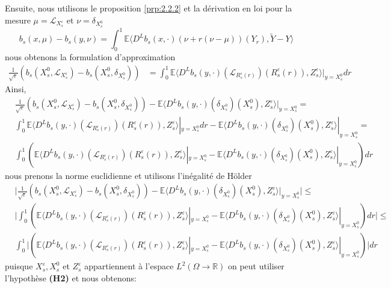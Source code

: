 \documentclass[12pt,a4paper,twoside,fleqn]{book}%
\theoremstyle{definition}
\theoremstyle{lemme}
\numberwithin{equation}{section}
\begin{document}
Ensuite, nous utilisons le proposition \ref{prp:2.2.2} et la dérivation en loi pour la mesure $\mu=\mathcal{L}_{X_s^\varepsilon}$ et $\nu=\delta_{X_s^0}$
\[
b_s(x,\mu)-b_s(y,\nu) = \int_{0}^{1}\mathbb{E}\langle D^Lb_s(x,\cdot)(\nu+r(\nu-\mu))(Y_r),\tilde{Y}-Y\rangle
\]
nous obtenons la formulation d'approximation
\[
\begin{aligned}
	\frac{1}{\sqrt{\varepsilon}}\left(b_s(X_s^0,\mathcal{L}_{X_s^\varepsilon})-b_s(X_s^0,\delta_{X_s^0})\right)&=\int_{0}^{1}\mathbb{E}\langle D^Lb_s(y,\cdot)(\mathcal{L}_{R_s^\varepsilon(r)})(R_s^\varepsilon(r)),Z_s^\varepsilon\rangle|_{y=X_s^0} dr
\end{aligned}
\]
Ainsi,
\[
\begin{aligned}
&\frac{1}{\sqrt{\varepsilon}}\left(b_s(X_s^0,\mathcal{L}_{X_s^\varepsilon})-b_s(X_s^0,\delta_{X_s^0})\right)-\mathbb{E}\langle D^L b_s(y, \cdot)(\delta_{X_s^0})(X_s^0), Z_s^\varepsilon\rangle|_{y=X_s^0} =\\& \int_{0}^{1}\mathbb{E}\langle D^Lb_s(y,\cdot)(\mathcal{L}_{R_s^\varepsilon(r)})(R_s^\varepsilon(r)),Z_s^\varepsilon\rangle|_{y=X_s^0} dr - \mathbb{E}\langle D^L b_s(y, \cdot)(\delta_{X_s^0})(X_s^0), Z_s^\varepsilon\rangle|_{y=X_s^0} =\\
&\int_{0}^{1}\left(\mathbb{E}\langle D^Lb_s(y,\cdot)(\mathcal{L}_{R_s^\varepsilon(r)})(R_s^\varepsilon(r)),Z_s^\varepsilon\rangle|_{y=X_s^0}  - \mathbb{E}\langle D^L b_s(y, \cdot)(\delta_{X_s^0})(X_s^0), Z_s^\varepsilon\rangle|_{y=X_s^0}\right)dr
\end{aligned}
\]
nous prenons la norme euclidienne et utilisons l'inégalité de Hölder
\[
\begin{aligned}&\Big|\frac{1}{\sqrt{\varepsilon}}\left(b_s(X_s^0,\mathcal{L}_{X_s^\varepsilon})-b_s(X_s^0,\delta_{X_s^0})\right)-\mathbb{E}\langle D^L b_s(y, \cdot)(\delta_{X_s^0})(X_s^0), Z_s^\varepsilon\rangle|_{y=X_s^0}\Big|\leq\\
&\Big|\int_{0}^{1}\left(\mathbb{E}\langle D^Lb_s(y,\cdot)(\mathcal{L}_{R_s^\varepsilon(r)})(R_s^\varepsilon(r)),Z_s^\varepsilon\rangle |_{y=X_s^0} - \mathbb{E}\langle D^L b_s(y, \cdot)(\delta_{X_s^0})(X_s^0), Z_s^\varepsilon\rangle|_{y=X_s^0}\right)dr\Big|\leq\\
&\int_{0}^{1}\Big|\left(\mathbb{E}\langle D^Lb_s(y,\cdot)(\mathcal{L}_{R_s^\varepsilon(r)})(R_s^\varepsilon(r)),Z_s^\varepsilon\rangle|_{y=X_s^0}  - \mathbb{E}\langle D^L b_s(y, \cdot)(\delta_{X_s^0})(X_s^0), Z_s^\varepsilon\rangle|_{y=X_s^0}\right)\Big|dr
\end{aligned}
\]
puisque $X_s^\varepsilon,X_s^0$ et $Z_s^\varepsilon$ appartiennent à l’espace $L^2(\Omega\to\mathbb{R})$ on peut utiliser l'hypothèse \textbf{(H2)} et nous obtenons:
\end{document}
